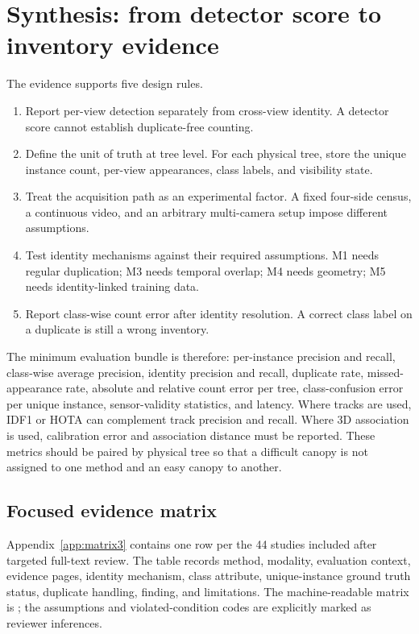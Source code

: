 \section{Synthesis: from detector score to inventory evidence}
\label{sec:synthesis2}

The evidence supports five design rules.

\begin{enumerate}[leftmargin=*,itemsep=2pt]
  \item Report per-view detection separately from cross-view identity. A detector score cannot establish duplicate-free counting.
  \item Define the unit of truth at tree level. For each physical tree, store the unique instance count, per-view appearances, class labels, and visibility state.
  \item Treat the acquisition path as an experimental factor. A fixed four-side census, a continuous video, and an arbitrary multi-camera setup impose different assumptions.
  \item Test identity mechanisms against their required assumptions. M1 needs regular duplication; M3 needs temporal overlap; M4 needs geometry; M5 needs identity-linked training data.
  \item Report class-wise count error after identity resolution. A correct class label on a duplicate is still a wrong inventory.
\end{enumerate}

The minimum evaluation bundle is therefore: per-instance precision and recall, class-wise average precision, identity precision and recall, duplicate rate, missed-appearance rate, absolute and relative count error per tree, class-confusion error per unique instance, sensor-validity statistics, and latency. Where tracks are used, IDF1 or HOTA can complement track precision and recall. Where 3D association is used, calibration error and association distance must be reported. These metrics should be paired by physical tree so that a difficult canopy is not assigned to one method and an easy canopy to another.

\subsection{Focused evidence matrix}

Appendix~\ref{app:matrix3} contains one row per the 44 studies included after targeted full-text review. The table records method, modality, evaluation context, evidence pages, identity mechanism, class attribute, unique-instance ground truth status, duplicate handling, finding, and limitations. The machine-readable matrix is ; the assumptions and violated-condition codes are explicitly marked as reviewer inferences.

